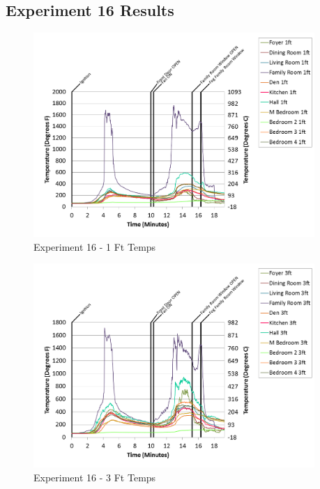 \documentclass{article}
\begin{document}
\begin{appendices}
\clearpage

\clearpage
\clearpage		\large
\subsection{Experiment 16 Results} \label{App:Exp16Results} 

\begin{figure}[h!]
	\centering
	\includegraphics[height=3.05in]{0_Images/Results_Charts/Exp_16_Charts/1FtTemps.png}
	\caption{Experiment 16 - 1 Ft Temps}
\end{figure}


\begin{figure}[h!]
	\centering
	\includegraphics[height=3.05in]{0_Images/Results_Charts/Exp_16_Charts/3FtTemps.png}
	\caption{Experiment 16 - 3 Ft Temps}
\end{figure}

\clearpage


\end{appendices}
\end{document}
